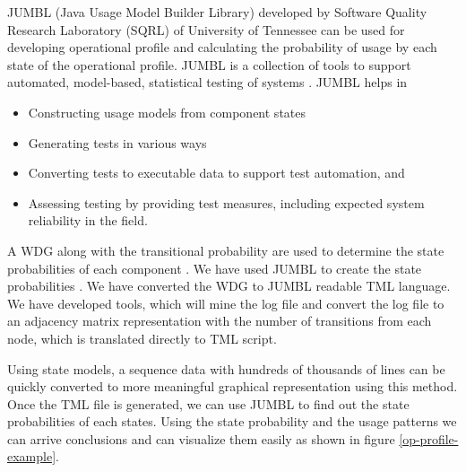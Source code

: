 JUMBL (Java Usage Model Builder Library) developed by Software Quality Research Laboratory (SQRL) of University of Tennessee \cite{jumbl} can be used for developing operational profile and calculating the probability of usage by each state of the operational profile. JUMBL is a collection of tools to support automated, model-based, statistical testing of systems \cite{jug}. JUMBL helps in

\begin{itemize}
\item Constructing usage models from component states
\item Generating tests in various ways
\item Converting tests to executable data to support test automation, and
\item Assessing testing by providing test measures, including expected system reliability in the field.
\end{itemize}

A WDG along with the transitional probability are used to determine the state probabilities of each component . We have used JUMBL to create the state probabilities \cite{anil}. We have converted the WDG to JUMBL readable TML \cite{tug} language. 
We have developed tools, which will mine the log file and convert the log file to an adjacency matrix representation with the number of transitions from each node, which is translated directly to TML script. 

Using state models, a sequence data with hundreds of thousands of lines can be quickly converted to more meaningful graphical representation using this method. Once the TML file is generated, we can use JUMBL to find out the state probabilities of each states. Using the state probability and the usage patterns we can arrive conclusions and can visualize them easily as  shown in figure \ref{op-profile-example}.



%
%
%
%
%
%
%
%
%




